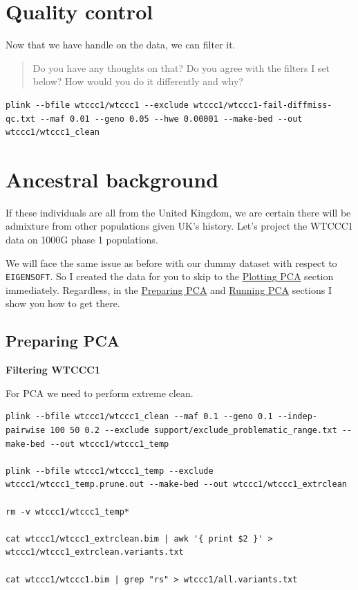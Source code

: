 \documentclass[
]{book}
\begin{document}
\hypertarget{quality-control-1}{%
\section{Quality control}\label{quality-control-1}}

Now that we have handle on the data, we can filter it.

\begin{quote}
Do you have any thoughts on that? Do you agree with the filters I set below? How would you do it differently and why?
\end{quote}

\begin{verbatim}
plink --bfile wtccc1/wtccc1 --exclude wtccc1/wtccc1-fail-diffmiss-qc.txt --maf 0.01 --geno 0.05 --hwe 0.00001 --make-bed --out wtccc1/wtccc1_clean
\end{verbatim}

\hypertarget{ancestral-background-1}{%
\section{Ancestral background}\label{ancestral-background-1}}

If these individuals are all from the United Kingdom, we are certain there will be admixture from other populations given UK's history. Let's project the WTCCC1 data on 1000G phase 1 populations.

We will face the same issue as before with our dummy dataset with respect to \texttt{EIGENSOFT}. So I created the data for you to skip to the \protect\hyperlink{plotting-pca}{Plotting PCA} section immediately. Regardless, in the \protect\hyperlink{preparing-pca}{Preparing PCA} and \protect\hyperlink{running-pca-1}{Running PCA} sections I show you how to get there.

\hypertarget{preparing-pca}{%
\subsection{Preparing PCA}\label{preparing-pca}}

\textbf{Filtering WTCCC1}

For PCA we need to perform extreme clean.

\begin{verbatim}
plink --bfile wtccc1/wtccc1_clean --maf 0.1 --geno 0.1 --indep-pairwise 100 50 0.2 --exclude support/exclude_problematic_range.txt --make-bed --out wtccc1/wtccc1_temp

plink --bfile wtccc1/wtccc1_temp --exclude wtccc1/wtccc1_temp.prune.out --make-bed --out wtccc1/wtccc1_extrclean

rm -v wtccc1/wtccc1_temp*

cat wtccc1/wtccc1_extrclean.bim | awk '{ print $2 }' > wtccc1/wtccc1_extrclean.variants.txt

cat wtccc1/wtccc1.bim | grep "rs" > wtccc1/all.variants.txt
\end{verbatim}
\end{document}

